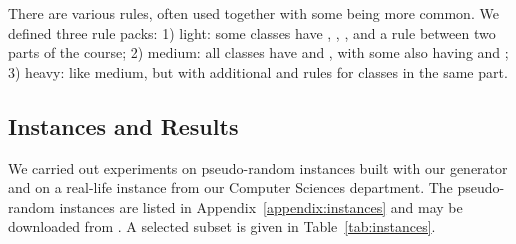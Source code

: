 

There are various rules, often used together with some being more common. We defined three rule packs: 1) light: some classes have \texttt{\SAMEROOMS{}}, \texttt{\SAMETEACHERS{}}, \texttt{\PERIODIC{}}, and a \texttt{\SEQUENCED{}} rule between two parts of the course; 2) medium: all classes have \texttt{\SAMEROOMS{}} and \texttt{\SAMETEACHERS{}}, with some also having \texttt{\PERIODIC{}} and \texttt{\SEQUENCED{}}; 3) heavy: like medium, but with additional \texttt{\SAMETEACHERS{}} and \texttt{\SAMESLOT{}} rules for classes in the same part.

\subsection{Instances and Results}\label{subsec:experiments}

%
We carried out experiments on pseudo-random instances built with our generator
and on a real-life instance from our Computer Sciences department. 
The pseudo-random instances are listed in Appendix~\ref{appendix:instances}
and may be downloaded from \cite{2024_UTP}.
A selected subset is given in Table~\ref{tab:instances}.



